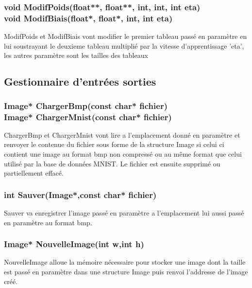 \documentclass{article}
\begin{document}
			\subsubsection{\textcolor{myblue}{\textbf{void}} ModifPoids(\textcolor{myblue}{\textbf{float**}},  \textcolor{myblue}{\textbf{float**}},  \textcolor{myblue}{\textbf{int}},  \textcolor{myblue}{\textbf{int}},  \textcolor{myblue}{\textbf{int}} eta)\\
			\textcolor{myblue}{\textbf{void}} ModifBiais(\textcolor{myblue}{\textbf{float*}},  \textcolor{myblue}{\textbf{float*}},  \textcolor{myblue}{\textbf{int}},  \textcolor{myblue}{\textbf{int}} eta)}
			ModifPoids et ModifBiais vont modifier le premier tableau passé en paramètre en lui soustrayant le deuxieme tableau multiplié par la vitesse d'apprentissage 'eta', les autres paramètre sont les tailles des tableaux
		
		
		
	\subsection{Gestionnaire d'entrées sorties}
		\subsubsection{\textcolor{myblue}{\textbf{Image*}} ChargerBmp(\textcolor{myblue}{\textbf{const char*}} fichier)\\
		\textcolor{myblue}{\textbf{Image*}} ChargerMnist(\textcolor{myblue}{\textbf{const char*}} fichier)}
		ChargerBmp et ChargerMnist vont lire a l'emplacement donné en paramètre et renvoyer le contenue du fichier sous forme de la structure Image si celui ci contient une image au format bmp non compressé ou au même format que celui utilisé par la base de données MNIST. Le fichier est ensuite supprimé ou partiellement effacé.
		
		\subsubsection{\textcolor{myblue}{\textbf{int}} Sauver(\textcolor{myblue}{\textbf{Image*}},\textcolor{myblue}{\textbf{const char*}} fichier)}
		Sauver va enregistrer l'image passé en paramètre a l'emplacement lui aussi passé en paramètre au format bmp.
		
		\subsubsection{\textcolor{myblue}{\textbf{Image*}} NouvelleImage(\textcolor{myblue}{\textbf{int}} w,\textcolor{myblue}{\textbf{int}} h)}
		NouvelleImage alloue la mémoire nécessaire pour stocker une image dont la taille est passé en paramètre dans une structure Image puis renvoi l'addresse de l'image créé.
		
\end{document}
